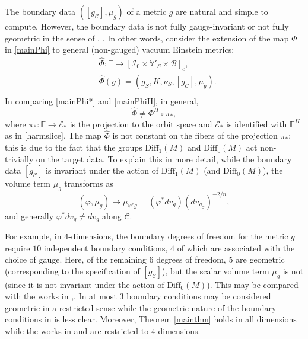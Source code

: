 \documentclass[10pt]{amsart}
\newcommand{\f}{\varphi}
\newcommand{\cC}{{\mathcal C}}
\newcommand{\cB}{{\mathcal B}}
\newcommand{\cE}{{\mathcal E}}
\newcommand{\cI}{\mathcal I}
\newcommand{\bE}{\mathbb E}
\newcommand{\bV}{\mathbb V}
\newcommand{\Diff}{\mathrm{Diff}}
\newcommand{\be}{\begin{equation}}
\newcommand{\ee}{\end{equation}}
\renewcommand{\to}{\rightarrow}
\renewcommand{\hat}{\widehat}
\newcommand{\<}{\langle}
\renewcommand{\>}{\rangle}
\theoremstyle{plain}
\theoremstyle{remark}
\theoremstyle{definition}
\numberwithin{equation}{section}
\begin{document}
\medskip 

  The boundary data $([g_{\cC}], \mu_g)$ of a metric $g$ are natural and simple to compute. However, the boundary data  is not fully gauge-invariant or 
not fully geometric in the sense of \cite{I}, \cite{AA2}. In other words, consider the extension of the map $\Phi$ in \eqref{mainPhi} to general (non-gauged) 
vacuum Einstein metrics: 
\be \label{mainPhi*}
\begin{split}
&\hat \Phi: \bE \to [\cI_0 \times \bV'_S \times \cB]_c,\\
&\hat \Phi(g) = (g_S, K, \nu_S, [g_{\cC}], \mu_g).\\
\end{split}
\ee
In comparing \eqref{mainPhi*} and \eqref{mainPhiH}, in general, 
\be \label{notgeo} 
\hat \Phi \neq \Phi^H\circ \pi_*,
\ee 
where $\pi_*: \bE \to \cE_*$ is the projection to the orbit space and $\cE_*$ is identified with $\bE^H$ as in \eqref{harmslice}. The map $\hat \Phi$ is not 
constant on the fibers of the projection $\pi_*$; this is due to the fact that the groups $\Diff_1(M)$ and $\Diff_0(M)$ act non-trivially on the target data. To 
explain this in more detail, while the boundary data $[g_{\cC}]$ is invariant under the action of $\Diff_1(M)$ (and $\Diff_0(M)$), the volume term $\mu_g$ 
transforms as 
\be \label{mutrans}
(\f, \mu_g) \to \mu_{\f^*g} = (\f^*dv_g)(dv_{g_\cC})^{-2/n},
\ee
and generally $\f^* dv_g \neq dv_g$ along $\cC$. 

 For example, in $4$-dimensions, the boundary degrees of freedom for the metric $g$ require $10$ independent boundary conditions, $4$ of which are 
 associated with the choice of gauge. Here, of the remaining $6$ degrees of freedom, $5$ are geometric (corresponding to the specification of 
 $[g_{\cC}]$), but the scalar volume term $\mu_g$ is not (since it is not invariant under the action of $\Diff_0(M)$). This may be compared with the 
 works in \cite{FN},\cite{KRSW}. In \cite{FN} at most $3$ boundary conditions may be considered geometric in a restricted sense while the geometric 
 nature of the boundary conditions in \cite{KRSW} is less clear. Moreover, Theorem \ref{mainthm} holds in all dimensions while the works in \cite{FN} and 
 \cite{KRSW} are restricted to $4$-dimensions. 
 
  \medskip 
  
\end{document}
